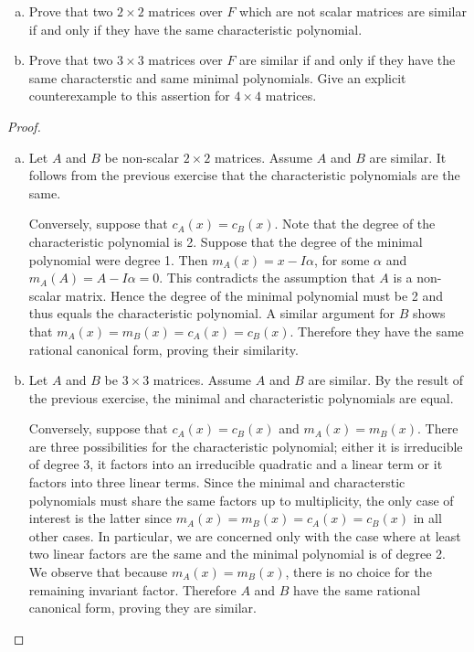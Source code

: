 \documentclass[10pt]{amsart}
\begin{document}
\begin{thm}
  \label{Ex2}
  \begin{enumerate}[(a)]
  \item
    Prove that two $2 \times 2$ matrices over $F$ which are not scalar matrices are similar if and only if they have the same characteristic polynomial.
  \item
    Prove that two $3 \times 3$ matrices over $F$ are similar if and only if they have the same characterstic and same minimal polynomials.
    Give an explicit counterexample to this assertion for $4 \times 4$ matrices.
  \end{enumerate}
  \begin{proof}
    \begin{enumerate}[(a)]
    \item
      Let $A$ and $B$ be non-scalar $2 \times 2$ matrices.
      Assume $A$ and $B$ are similar.
      It follows from the previous exercise that the characteristic polynomials are the same.
      
      Conversely, suppose that $c_A(x) = c_B(x)$.
      Note that the degree of the characteristic polynomial is 2.
      Suppose that the degree of the minimal polynomial were degree 1.
      Then $m_A(x) = x - I\alpha$, for some $\alpha$ and $m_A(A) = A - I\alpha = 0$.
      This contradicts the assumption that $A$ is a non-scalar matrix.
      Hence the degree of the minimal polynomial must be 2 and thus equals the characteristic polynomial.
      A similar argument for $B$ shows that $m_A(x) = m_B(x) = c_A(x) = c_B(x)$.
      Therefore they have the same rational canonical form, proving their similarity.
    \item
      Let $A$ and $B$ be $3 \times 3$ matrices.
      Assume $A$ and $B$ are similar.
      By the result of the previous exercise, the minimal and characteristic polynomials are equal.
      
      Conversely, suppose that $c_A(x) = c_B(x)$ and $m_A(x) = m_B(x)$.
      There are three possibilities for the characteristic polynomial; either it is irreducible of degree 3, it factors into an irreducible quadratic and a linear term or it factors into three linear terms.
      Since the minimal and characterstic polynomials must share the same factors up to multiplicity, the only case of interest is the latter since $m_A(x) = m_B(x) = c_A(x) = c_B(x)$ in all other cases.
      In particular, we are concerned only with the case where at least two linear factors are the same and the minimal polynomial is of degree 2.
      We observe that because  $m_A(x) = m_B(x)$, there is no choice for the remaining invariant factor.
      Therefore $A$ and $B$ have the same rational canonical form, proving they are similar.
    \end{enumerate}
  \end{proof}
\end{thm}
\end{document}
